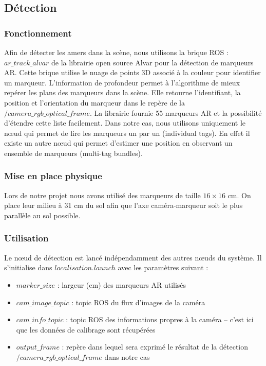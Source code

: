 \documentclass[10pt,a4paper]{article}
\begin{document}
\subsection{Détection}
\label{sec:detection}

\subsubsection{Fonctionnement}

Afin de détecter les amers dans la scène, nous utilisons la brique ROS : $ar\_track\_alvar$ de la librairie open source Alvar pour la détection de marqueurs AR.
Cette brique utilise le nuage de points 3D associé à la couleur pour identifier un marqueur. L'information de profondeur permet à l'algorithme de mieux repérer les plans des marqueurs dans la scène. Elle retourne l'identifiant, la position et l'orientation du marqueur dans le repère de la $/camera\_rgb\_optical\_frame$. La librairie fournie 55 marqueurs AR et la possibilité d'étendre cette liste facilement. Dans notre cas, nous utilisons uniquement le nœud qui permet de lire les marqueurs un par un (individual tags). En effet il existe un autre nœud qui permet d'estimer une position en observant un ensemble de marqueurs (multi-tag bundles).

\subsubsection{Mise en place physique} 
Lors de notre projet nous avons utilisé des marqueurs de taille $16 \times 16$ cm. On place leur milieu à 31 cm du sol afin que l'axe caméra-marqueur soit le plus parallèle au sol possible.

\subsubsection{Utilisation}

Le nœud de détection est lancé indépendamment des autres nœuds du système. Il s'initialise dans $localisation.launch$ avec les paramètres suivant : 
\begin{itemize}
\item $marker\_size$ : largeur (cm) des marqueurs AR utilisés
\item $cam\_image\_topic$ : topic ROS du flux d'images de la caméra
\item $cam\_info\_topic$ : topic ROS des informations propres à la caméra -- c'est ici que les données de calibrage sont récupérées
\item $output\_frame$ : repère dans lequel sera exprimé le résultat de la détection \\ $/camera\_rgb\_optical\_frame$ dans notre cas
\end{itemize}
\end{document}
